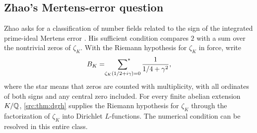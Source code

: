 \subsection{Zhao's Mertens-error question}\label{zer:sec:zhao}

Zhao asks for a classification of number fields related to the sign of the integrated
prime-ideal Mertens error \cite[\S8(3)]{Zhao2025Mertens}. His sufficient condition
compares $2$ with a sum over the nontrivial zeros of $\zeta_K$. With the Riemann hypothesis
for $\zeta_K$ in force, write
\begin{equation}\label{zer:eq:BK}
 B_K=\sideset{}{^*}\sum_{\zeta_K(1/2+i\gamma)=0}\frac1{1/4+\gamma^2},
\end{equation}
where the star means that zeros are counted with multiplicity, with all ordinates of both
signs and any central zero included. For every finite abelian extension $K/\mathbb{Q}$,
\cref{src:thm:dgrh} supplies the Riemann hypothesis for $\zeta_K$ through the factorization
of $\zeta_K$ into Dirichlet $L$-functions. The numerical condition can be resolved in this
entire class.

